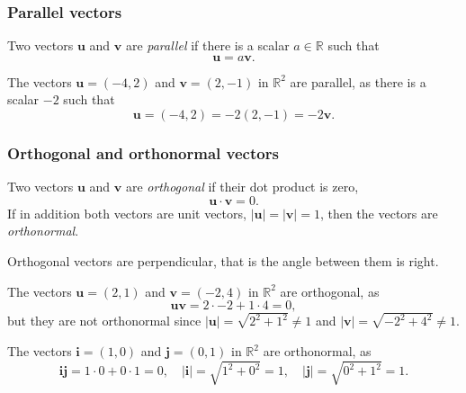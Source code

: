 \begin{frame}
\frametitle{Parallel vectors}
\begin{definition}
Two vectors $\mathbf{u}$ and $\mathbf{v}$ are \emph{parallel} if there is a scalar $a\in\mathbb{R}$ such that 
\[
\mathbf{u} = a\mathbf{v}.
\]
\end{definition}

The vectors $\mathbf{u}=(-4,2)$ and $\mathbf{v}=(2,-1)$ in $\mathbb{R}^2$ are parallel, as there is a scalar $-2$ such that
\[
\mathbf{u}= (-4,2) = -2(2,-1) = -2\mathbf{v}.
\]
\end{frame}


\begin{frame}
\frametitle{Orthogonal and orthonormal vectors}
\begin{definition}
Two vectors $\mathbf{u}$ and $\mathbf{v}$ are \emph{orthogonal} if their dot product is zero,
\[
\mathbf{u}\cdot \mathbf{v} = 0.
\]
If in addition both vectors are unit vectors, $|\mathbf{u}|=|\mathbf{v}|=1$, then the vectors are \emph{orthonormal}.
\end{definition}

Orthogonal vectors are perpendicular, that is the angle between them is right.

The vectors $\mathbf{u}=(2,1)$ and $\mathbf{v}=(-2,4)$ in $\mathbb{R}^2$ are orthogonal, as
\[
\mathbf{u}\mathbf{v} = 2\cdot -2 +1\cdot 4 = 0,
\]
but they are not orthonormal since $|\mathbf{u}| = \sqrt{2^2+1^2} \neq 1$ and $|\mathbf{v}| = \sqrt{-2^2+4^2} \neq 1$.

The vectors $\mathbf{i}=(1,0)$ and $\mathbf{j}=(0,1)$ in $\mathbb{R}^2$ are orthonormal, as
\[
\mathbf{i}\mathbf{j} = 1\cdot 0 +0\cdot 1 = 0, \quad |\mathbf{i}| = \sqrt{1^2+0^2} = 1,  \quad |\mathbf j| = \sqrt{0^2+1^2} = 1.
\]
\end{frame}



